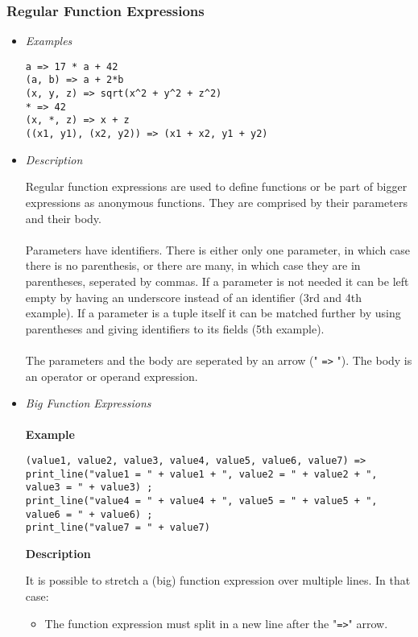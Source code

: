 \documentclass{article}
\begin{document}
\subsubsection{Regular Function Expressions}

\begin{itemize}
\item \textit{Examples}

\begin{verbatim}
a => 17 * a + 42
(a, b) => a + 2*b
(x, y, z) => sqrt(x^2 + y^2 + z^2)
* => 42
(x, *, z) => x + z
((x1, y1), (x2, y2)) => (x1 + x2, y1 + y2)
\end{verbatim}

\item \textit{Description}

Regular function expressions are used to define functions or be part of bigger
expressions as anonymous functions. They are comprised by their parameters and
their body.
\\\\
Parameters have identifiers. There is either only one parameter, in which case
there is no parenthesis, or there are many, in which case they are in
parentheses, seperated by commas. If a parameter is not needed it can be left
empty by having an underscore instead of an identifier (3rd and 4th example).
If a parameter is a tuple itself it can be matched further by using parentheses
and giving identifiers to its fields (5th example).
\\\\
The parameters and the body are seperated
by an arrow (" \texttt{=>} "). The body is an operator or operand expression.

\item \textit{Big Function Expressions}\\\\
\textbf{Example}

\begin{verbatim}
(value1, value2, value3, value4, value5, value6, value7) => 
print_line("value1 = " + value1 + ", value2 = " + value2 + ", value3 = " + value3) ;
print_line("value4 = " + value4 + ", value5 = " + value5 + ", value6 = " + value6) ;
print_line("value7 = " + value7)
\end{verbatim}

\textbf{Description}

It is possible to stretch a (big) function expression over multiple lines.
In that case:
\begin{itemize}
\item
The function expression must split in a new line after the "\texttt{=>}" arrow.


\end{itemize}
\end{itemize}
\end{document}
